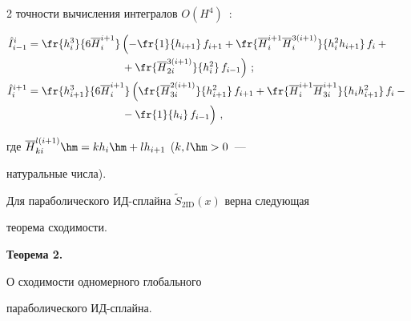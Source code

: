 \begin{multicols}{2}
точности вычисления интегралов $O(H^4)$~\cite{8-kir}: 


  \begin{align}


  \hat{I}_{i-1}^i &= \fr{h_i^3}{6\overline{H}_i^{i+1}}\left(  -


\fr{1}{h_{i+1}}\,f_{i+1} +\fr{\overline{H}_i^{i+1}\overline{H}_i^{3(i+1)}} 


{h_i^2 h_{i+1}}\,f_i +{}\right.\notag\\


&\hspace*{30mm}\left.{}+\fr{\overline{H}_{2i}^{3(i+1)}}{h_i^2}\,f_{i-1}\right)\,; 


\label{e12-kir}\\


  \hat{I}_i^{i+1} &= \fr{h^3_{i+1}}{6\overline{H}_i^{i+1}}\left(  


\fr{\overline{H}_{3i}^{2(i+1)}}{h^2_{i+1}}\,f_{i+1} + \fr{\overline{H}_i^{i+1} 


\overline{H}_{3i}^{i+1}} {h_i h^2_{i+1}}\,f_i -{}\right.\notag\\


&\hspace*{30mm}\left.{}-\fr{1}{h_i}\,f_{i- 1}


\vphantom{ \fr{\overline{H}_i^{i+1} 


\overline{H}_{3i}^{i+1}} {h_i h^2_{i+1}}}


\right)\,,\label{e13-kir}


  \end{align}


где $\overline{H}_{ki}^{l(i+1)} \hm= kh_i\hm+lh_{i+1}$ ($k, l\hm>0$~--- 


натуральные числа).


  


  Для параболического ИД-сплай\-на $\tilde{S}_{2\mathrm{ID}}(x)$ верна следующая 


теорема сходимости. 


  


  \medskip


  


  \noindent


\textbf{Теорема 2.} {О сходимости одномерного глобального 


параболического ИД-сплай\-на.}






\end{multicols}
